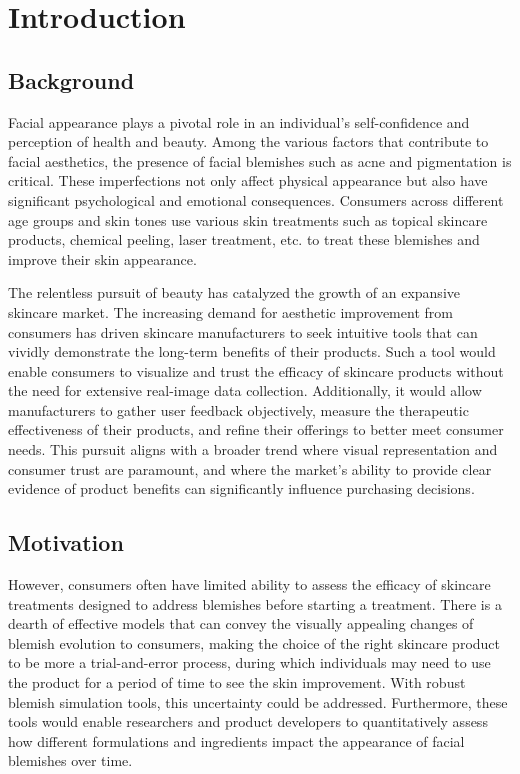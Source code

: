 
\chapter{Introduction}
\begin{spacing}{1.5}
\setlength{\parskip}{0.3in}

\section{Background}

Facial appearance plays a pivotal role in an individual's self-confidence and perception of health and beauty. Among the various factors that contribute to facial aesthetics, the presence of facial blemishes such as acne and pigmentation is critical. These imperfections not only affect physical appearance but also have significant psychological and emotional consequences. Consumers across different age groups and skin tones use various skin treatments such as topical skincare products, chemical peeling, laser treatment, etc. to treat these blemishes and improve their skin appearance\cite{doi:10.2352/EI.2023.35.7.IMAGE-276}.

The relentless pursuit of beauty has catalyzed the growth of an expansive skincare market. The increasing demand for aesthetic improvement from consumers has driven skincare manufacturers to seek intuitive tools that can vividly demonstrate the long-term benefits of their products. Such a tool would enable consumers to visualize and trust the efficacy of skincare products without the need for extensive real-image data collection. Additionally, it would allow manufacturers to gather user feedback objectively, measure the therapeutic effectiveness of their products, and refine their offerings to better meet consumer needs. This pursuit aligns with a broader trend where visual representation and consumer trust are paramount, and where the market's ability to provide clear evidence of product benefits can significantly influence purchasing decisions.

\section{Motivation}

However, consumers often have limited ability to assess the efficacy of skincare treatments designed to address blemishes before starting a treatment\cite{doi:10.2352/EI.2023.35.7.IMAGE-276}. There is a dearth of effective models that can convey the visually appealing changes of blemish evolution to consumers, making the choice of the right skincare product to be more a trial-and-error process, during which individuals may need to use the product for a period of time to see the skin improvement. With robust blemish simulation tools, this uncertainty could be addressed. Furthermore, these tools would enable researchers and product developers to quantitatively assess how different formulations and ingredients impact the appearance of facial blemishes over time.


\end{spacing}
